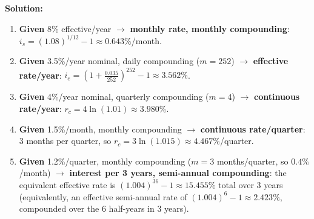 \documentclass[11pt,letterpaper]{article}
\begin{document}
\textbf{Solution:}
\begin{enumerate}
    \item \textbf{Given} 8\% effective/year $\to$ \textbf{monthly rate,
    monthly compounding}: $i_s = (1.08)^{1/12} - 1 \approx 0.643\%$/month.
    \item \textbf{Given} 3.5\%/year nominal, daily compounding ($m=252$)
    $\to$ \textbf{effective rate/year}: $i_e = \left(1+\frac{0.035}{252}\right)^{252}-1 \approx 3.562\%$.
    \item \textbf{Given} 4\%/year nominal, quarterly compounding
    ($m=4$) $\to$ \textbf{continuous rate/year}: $r_c = 4\ln(1.01) \approx 3.980\%$.
    \item \textbf{Given} 1.5\%/month, monthly compounding $\to$
    \textbf{continuous rate/quarter}: 3 months per quarter, so
    $r_c = 3\ln(1.015) \approx 4.467\%$/quarter.
    \item \textbf{Given} 1.2\%/quarter, monthly compounding ($m=3$
    months/quarter, so $0.4\%$/month) $\to$ \textbf{interest per 3
    years, semi-annual compounding}: the equivalent effective rate is
    $(1.004)^{36}-1 \approx 15.455\%$ total over 3 years (equivalently,
    an effective semi-annual rate of $(1.004)^6-1 \approx 2.423\%$,
    compounded over the 6 half-years in 3 years).
\end{enumerate}
\end{document}
